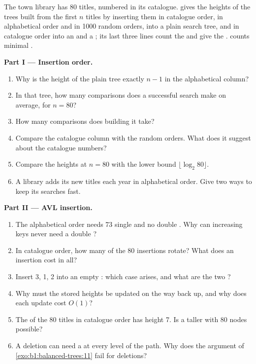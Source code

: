 \begin{problem}\label{pb:b1:balanced-trees:1}
The town library has 80 titles, numbered in its catalogue.  gives the heights of
the trees built from the first $n$ titles by inserting them in catalogue order, in alphabetical order and in 1000 random
orders, into a plain search tree, and in catalogue order into an  and a ; its last
three lines count the  and give the .  counts minimal .

\medskip\noindent\textbf{Part I --- Insertion order.}
\begin{enumerate}
\item Why is the height of the plain tree exactly $n - 1$ in the alphabetical column?
\item In that tree, how many comparisons does a successful search make on average, for $n = 80$?
\item How many comparisons does building it take?
\item Compare the catalogue column with the random orders. What does it suggest about the catalogue numbers?
\item Compare the heights at $n = 80$ with the lower bound $\lfloor \log_2 80 \rfloor$.
\item A library adds its new titles each year in alphabetical order. Give two ways to keep its searches fast.
\end{enumerate}

\medskip\noindent\textbf{Part II --- AVL insertion.}
\begin{enumerate}[resume]
\item The alphabetical order needs 73 single  and no double . Why can increasing keys never need a
double ?
\item In catalogue order, how many of the 80 insertions rotate? What does an insertion cost in all?
\item Insert 3, 1, 2 into an empty : which case arises, and what are the two ?
\item Why must the stored heights be updated on the way back up, and why does each update cost $O(1)$?
\item The  of the 80 titles in catalogue order has height 7. Is a taller  with 80 nodes possible?
\item A deletion can need a  at every level of the path. Why does the argument of \cref{exo:b1:balanced-trees:11}
fail for deletions?
\end{enumerate}


\end{problem}
